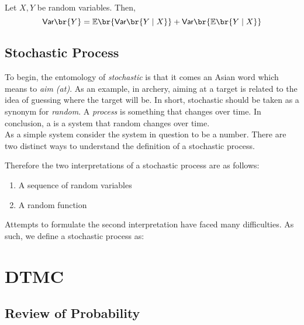 \documentclass{article}
\newcommand{\Var}{\textsf{Var}}
\newcommand{\Exp}{\mathbb{E}}
\begin{document}
\begin{theorem}
     Let $X, Y$ be random variables. Then,
    \[ \Var \br{Y} = \Exp\br{\Var\br{Y \mid X}} + \Var\br{\Exp\br{Y \mid X}} \]

\end{theorem}

\subsection{Stochastic Process}

To begin, the entomology of \textit{stochastic} is that it comes an Asian word which means to \textit{aim (at)}. As an example, in archery, aiming at a target is related to the idea of guessing where the target will be. In short, stochastic should be taken as a synonym for \textit{random}. A \textit{process} is something that changes over time.  In conclusion, a  is a system that random changes over time. \\

As a simple system consider the system in question to be a number. There are two distinct ways to understand the definition of a stochastic process.

\begin{center}
\end{center}
Therefore the two interpretations of a stochastic process are as follows:
\begin{enumerate}
    \item A sequence of random variables
    \item A random function
\end{enumerate}
Attempts to formulate the second interpretation have faced many difficulties. As such, we define a stochastic process as:
\section{DTMC}

\subsection{Review of Probability}
\end{document}
